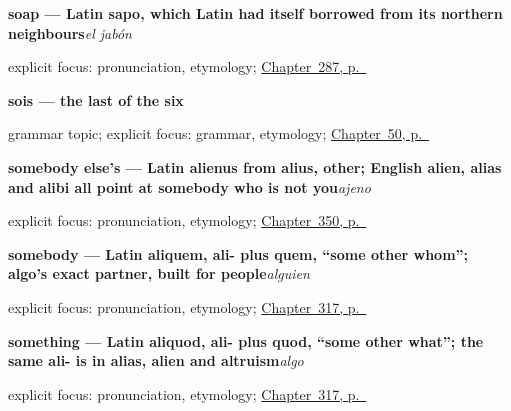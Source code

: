 \noindent\begin{minipage}[t]{\linewidth}
\raggedright
\textbf{soap — Latin sapo, which Latin had itself borrowed from its northern neighbours}\enspace\emph{el jabón}\par
\footnotesize explicit focus: pronunciation, etymology; \hyperref[ch:cinco-cosas]{Chapter~287, p.~\pageref*{ch:cinco-cosas}}
\end{minipage}\par\smallskip

\noindent\begin{minipage}[t]{\linewidth}
\raggedright
\textbf{sois — the last of the six}\par
\footnotesize grammar topic; explicit focus: grammar, etymology; \hyperref[ch:spanish-ser-plural]{Chapter~50, p.~\pageref*{ch:spanish-ser-plural}}
\end{minipage}\par\smallskip

\noindent\begin{minipage}[t]{\linewidth}
\raggedright
\textbf{somebody else's — Latin alienus from alius, other; English alien, alias and alibi all point at somebody who is not you}\enspace\emph{ajeno}\par
\footnotesize explicit focus: pronunciation, etymology; \hyperref[ch:propio-y-ajeno]{Chapter~350, p.~\pageref*{ch:propio-y-ajeno}}
\end{minipage}\par\smallskip

\noindent\begin{minipage}[t]{\linewidth}
\raggedright
\textbf{somebody — Latin aliquem, ali- plus quem, \textquotedblleft{}some other whom\textquotedblright{}; algo's exact partner, built for people}\enspace\emph{alguien}\par
\footnotesize explicit focus: pronunciation, etymology; \hyperref[ch:algo-y-nadie]{Chapter~317, p.~\pageref*{ch:algo-y-nadie}}
\end{minipage}\par\smallskip

\noindent\begin{minipage}[t]{\linewidth}
\raggedright
\textbf{something — Latin aliquod, ali- plus quod, \textquotedblleft{}some other what\textquotedblright{}; the same ali- is in alias, alien and altruism}\enspace\emph{algo}\par
\footnotesize explicit focus: pronunciation, etymology; \hyperref[ch:algo-y-nadie]{Chapter~317, p.~\pageref*{ch:algo-y-nadie}}
\end{minipage}\par\smallskip

